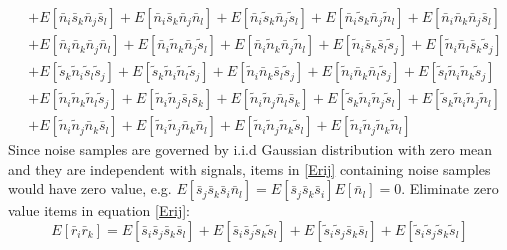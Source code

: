 \begin{equation}
\begin{split}
&+E[\bar{n}_i\bar{s}_k\bar{n}_j\bar{s}_l]+E[\bar{n}_i\bar{s}_k\bar{n}_j\bar{n}_l]+E[\bar{n}_i\tilde{s}_k\bar{n}_j\tilde{s}_l]+E[\bar{n}_i\tilde{s}_k\bar{n}_j\tilde{n}_l]+E[\bar{n}_i\bar{n}_k\bar{n}_j\bar{s}_l]\\
&+E[\bar{n}_i\bar{n}_k\bar{n}_j\bar{n}_l]+E[\bar{n}_i\tilde{n}_k\bar{n}_j\tilde{s}_l]+E[\bar{n}_i\tilde{n}_k\bar{n}_j\tilde{n}_l]+E[\tilde{n}_i\bar{s}_k\bar{s}_l\tilde{s}_j]+E[\tilde{n}_i\bar{n}_l\bar{s}_k\tilde{s}_j]\\
&+E[\tilde{s}_k\tilde{n}_i\tilde{s}_l\tilde{s}_j]+E[\tilde{s}_k\tilde{n}_i\tilde{n}_l\tilde{s}_j]+E[\tilde{n}_i\bar{n}_k\bar{s}_l\tilde{s}_j]+E[\tilde{n}_i\bar{n}_k\bar{n}_l\tilde{s}_j]+E[\tilde{s}_l\tilde{n}_i\tilde{n}_k\tilde{s}_j]\\
&+E[\tilde{n}_i\tilde{n}_k\tilde{n}_l\tilde{s}_j]+E[\tilde{n}_i\tilde{n}_j\bar{s}_l\bar{s}_k]+E[\tilde{n}_i\tilde{n}_j\bar{n}_l\bar{s}_k]+E[\tilde{s}_k\tilde{n}_i\tilde{n}_j\tilde{s}_l]+E[\tilde{s}_k\tilde{n}_i\tilde{n}_j\tilde{n}_l]\\
&+E[\tilde{n}_i\tilde{n}_j\bar{n}_k\bar{s}_l]+E[\tilde{n}_i\tilde{n}_j\bar{n}_k\bar{n}_l]+E[\tilde{n}_i\tilde{n}_j\tilde{n}_k\tilde{s}_l]+E[\tilde{n}_i\tilde{n}_j\tilde{n}_k\tilde{n}_l]
  \end{split}
  \label{Erij}
\end{equation}
Since noise samples are governed by i.i.d Gaussian distribution with zero mean and they are independent with signals, items in \eqref{Erij} containing noise samples would have zero value, e.g. $E[\bar{s}_j\bar{s}_k\bar{s}_i\bar{n}_l] = E[\bar{s}_j\bar{s}_k\bar{s}_i]E[\bar{n}_l] = 0$. Eliminate zero value items in equation \eqref{Erij}:
\begin{equation}
  E[\bar{r}_i\bar{r}_k] = E[\bar{s}_i\bar{s}_j\bar{s}_k\bar{s}_l] + E[\bar{s}_i\bar{s}_j\tilde{s}_k\tilde{s}_l] + E[\tilde{s}_i\tilde{s}_j\bar{s}_k\bar{s}_l] + E[\tilde{s}_i\tilde{s}_j\tilde{s}_k\tilde{s}_l]
  \label{equ:Erirk}
\end{equation} 

